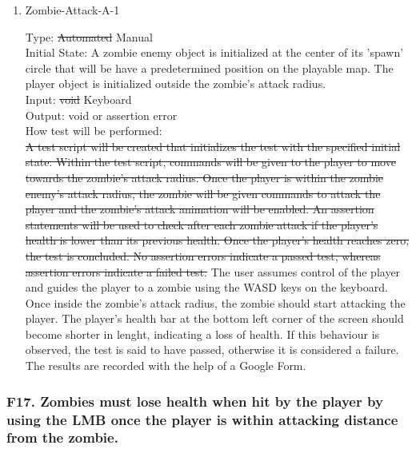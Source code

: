 \documentclass[12pt, titlepage]{article}
\DeclareRobustCommand{\hsout}[1]{\texorpdfstring{\sout{#1}}{#1}}
\newcounter{ftnum}
\begin{document}
\begin{enumerate}

\item{Zombie-Attack-A-1\\}  \label{F16-1}

Type: \hsout{Automated} {\color{magenta} Manual} \\
					
Initial State: A zombie enemy object is initialized at the center of its 'spawn' circle that will be have a predetermined position on the playable map. The player object is initialized outside the zombie's attack radius.\\
					
Input: \hsout{void} {\color{magenta} Keyboard} \\
					
Output: void or assertion error \\
					
How test will be performed:\\  \hsout{A test script will be created that initializes the test with the specified initial state. Within the test script, commands will be given to the player to move towards the zombie's attack radius.  Once the player is within the zombie enemy's attack radius, the zombie will be given commands to attack the player and the zombie's attack animation will be enabled. An assertion statements will be used to check after each zombie attack if the player's health is lower than its previous health. Once the player's health reaches zero, the test is concluded. No assertion errors indicate a passed test, whereas assertion errors indicate a failed test.}
{\color{magenta} The user assumes control of the player and guides the player to a zombie using the WASD keys on the keyboard. Once inside the zombie's attack radius, the zombie should start attacking the player. The player's health bar at the bottom left corner of the screen should become shorter in lenght, indicating a loss of health. If this behaviour is observed, the test is said to have passed, otherwise it is considered a failure. The results are recorded with the help of a Google Form.}\\

\end{enumerate}

\subsubsection{{\color{magenta} F17.} Zombies must lose health when hit by the player {\color{magenta} by using the LMB once the player is within attacking distance from the zombie.}} 
\end{document}
